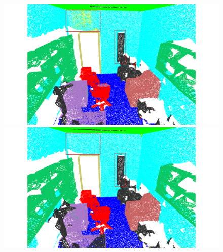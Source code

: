 \begin{figure}[htbp]
\begin{minipage}{0.185\textwidth}
    \end{minipage}
    \hfill
    \begin{minipage}{0.185\textwidth}
        \centering
        \includegraphics[width=\textwidth]{fig/supplement/semantic_segmentation/office_9/PLT_office_9.pdf}
    \end{minipage}
    \hfill
    \begin{minipage}{0.185\textwidth}
        \centering
        \includegraphics[width=\textwidth]{fig/supplement/semantic_segmentation/office_9/GT_office_9.pdf}
    \end{minipage}
    \hfill

    \vspace{0.5em}


\end{figure}
